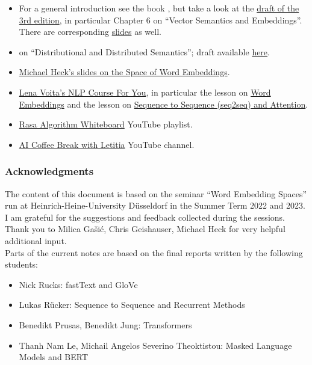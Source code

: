 \documentclass[11pt, a4paper]{amsart}
\begin{document}
\begin{itemize}
    \item For a general introduction see the book \cite{jurafsky2009speech}, but take a look at the \href{https://web.stanford.edu/~jurafsky/slp3/}{draft of the 3rd edition}, in particular Chapter 6 on ``Vector Semantics and Embeddings''.
    There are corresponding \href{https://web.stanford.edu/~jurafsky/slp3/slides/6_Vector_Apr18_2021.pdf}{slides} as well.

    \item \cite[Chp.~14]{eisenstein2019introduction} on ``Distributional and Distributed Semantics'';
    draft available \href{https://github.com/jacobeisenstein/gt-nlp-class/blob/master/notes/eisenstein-nlp-notes.pdf}{here}.

    \item \href{https://www.cs.hhu.de/fileadmin/redaktion/Fakultaeten/Mathematisch-Naturwissenschaftliche_Fakultaet/Informatik/Dialog_Systems_and_Machine_Learning/20190705_word_embeddings.pdf}{Michael Heck's slides on the Space of Word Embeddings}.
    
    \item \href{https://lena-voita.github.io/nlp_course}{Lena Voita's NLP Course For You}, in particular the lesson on \href{https://lena-voita.github.io/nlp_course/word_embeddings}{Word Embeddings} and the lesson on \href{https://lena-voita.github.io/nlp_course/seq2seq_and_attention.html}{Sequence to Sequence (seq2seq) and Attention}.
    
    \item \href{https://youtube.com/playlist?list=PL75e0qA87dlG-za8eLI6t0_Pbxafk-cxb}{Rasa Algorithm Whiteboard} YouTube playlist.
    
    \item \href{https://www.youtube.com/c/aicoffeebreak}{AI Coffee Break with Letitia} YouTube channel.
\end{itemize}

\subsubsection{Acknowledgments}

The content of this document is based on the seminar ``Word Embedding Spaces'' run at Heinrich-Heine-University Düsseldorf in the Summer Term 2022 and 2023.
I am grateful for the suggestions and feedback collected during the sessions. Thank you to Milica Gašić, Chris Geishauser, Michael Heck for very helpful additional input. \\
Parts of the current notes are based on the final reports written by the following students:
\begin{itemize}
	\item Nick Rucks: fastText and GloVe
	\item Lukas Rücker: Sequence to Sequence and Recurrent Methods
	\item Benedikt Prusas, Benedikt Jung: Transformers
	\item Thanh Nam Le, Michail Angelos Severino Theoktistou: Masked Language Models and BERT
\end{itemize}
\end{document}
